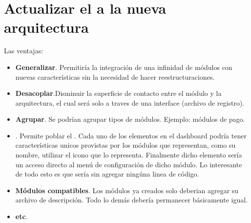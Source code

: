 
\section{Actualizar el \frameworkPC a la nueva arquitectura}

Las ventajas:

\begin{itemize}
		\item
			\textbf{Generalizar}. Permitiría la integración de una infinidad de módulos con nuevas características sin la necesidad de hacer reestructuraciones.
		\item
			\textbf{Desacoplar}.Disminuir la superficie de contacto entre el módulo y la arquitectura, el cual será solo a traves de una interface (archivo de registro).
		\item
			\textbf{Agrupar}. Se podrían agrupar tipos de módulos. Ejemplo: módulos de pago.
		\item
			\textbf{\dashboardEF}. Permite poblar el \dashboardEF. Cada uno de los elementos en el dashboard podría tener características unicos provistas por los módulos que representan, como su nombre, utilizar el icono que lo representa. Finalmente dicho elemento sería un acceso directo al menú de configuración de dicho módulo. Lo interesante de todo esto es que sería sin agregar ningúna linea de código.
		\item
			\textbf{Módulos compatibles}. Los módulos ya creados solo deberian agregar su archivo de descripción. Todo lo demás debería permanecer básicamente igual.
		\item
			\textbf{etc}.
	\end{itemize}